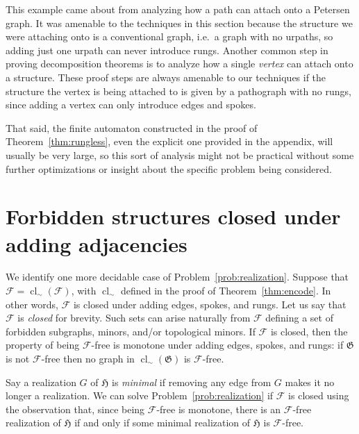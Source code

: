 \documentclass{article}
\newcommand{\Fc}{\mathcal{F}}
\newcommand{\Gf}{\mathfrak{G}}
\newcommand{\Hf}{\mathfrak{H}}
\DeclareMathOperator{\cl}{cl}
\begin{document}
This example came about from analyzing how a path can attach onto a Petersen graph. It was amenable to the techniques in this section because the structure we were attaching onto is a conventional graph, i.e.\ a graph with no urpaths, so adding just one urpath can never introduce rungs. Another common step in proving decomposition theorems is to analyze how a single \textit{vertex} can attach onto a structure. These proof steps are always amenable to our techniques if the structure the vertex is being attached to is given by a pathograph with no rungs, since adding a vertex can only introduce edges and spokes.

That said, the finite automaton constructed in the proof of Theorem~\ref{thm:rungless}, even the explicit one provided in the appendix, will usually be very large, so this sort of analysis might not be practical without some further optimizations or insight about the specific problem being considered.

\section{Forbidden structures closed under adding adjacencies}\label{sec:closed}

We identify one more decidable case of Problem~\ref{prob:realization}. Suppose that $\Fc=\cl_\sim(\Fc)$, with $\cl_\sim$ defined in the proof of Theorem~\ref{thm:encode}. In other words, $\Fc$ is closed under adding edges, spokes, and rungs. Let us say that $\Fc$ is \textit{closed} for brevity. Such sets can arise naturally from $\Fc$ defining a set of forbidden subgraphs, minors, and/or topological minors. If $\Fc$ is closed, then the property of being $\Fc$-free is monotone under adding edges, spokes, and rungs: if $\Gf$ is not $\Fc$-free then no graph in $\cl_\sim(\Gf)$ is $\Fc$-free.

Say a realization $G$ of $\Hf$ is \textit{minimal} if removing any edge from $G$ makes it no longer a realization. We can solve Problem~\ref{prob:realization} if $\Fc$ is closed using the observation that, since being $\Fc$-free is monotone, there is an $\Fc$-free realization of $\Hf$ if and only if some minimal realization of $\Hf$ is $\Fc$-free.

\closeddecidable*
\end{document}
